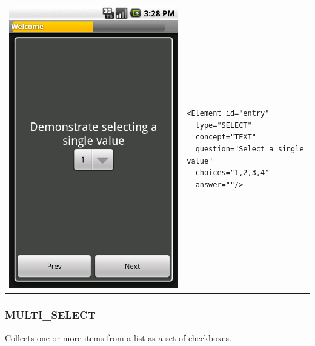 \documentclass[a4paper,10pt]{article}
\begin{document}
\noindent\begin{tabular}{ p{3.5cm}  p{7.5cm} }
\includegraphics[scale=0.2,keepaspectratio=true]{client_select.png}
& \begin{verbatim}<Element id="entry"
  type="SELECT"
  concept="TEXT"
  question="Select a single value" 
  choices="1,2,3,4"
  answer=""/>\end{verbatim}
\end{tabular}


\subsubsection{MULTI\_SELECT} Collects one or more items from a list as a set of 
checkboxes.
\end{document}
